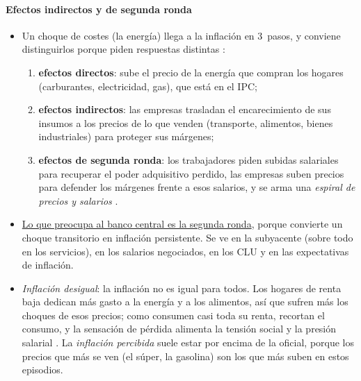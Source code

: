 \documentclass[11pt]{article}
\begin{document}
\paragraph{Efectos indirectos y de segunda ronda}
\begin{itemize}
\item Un choque de costes (la energía) llega a la inflación en 3~pasos, y conviene distinguirlos porque piden respuestas distintas \parencite[cap.~4]{BdE2022InformeAnual2021}:
  \begin{enumerate}
  \item \textbf{efectos directos}: sube el precio de la energía que compran los hogares (carburantes, electricidad, gas), que está en el IPC;
  \item \textbf{efectos indirectos}: las empresas trasladan el encarecimiento de sus insumos a los precios de lo que venden (transporte, alimentos, bienes industriales) para proteger sus márgenes;
  \item \textbf{efectos de segunda ronda}: los trabajadores piden subidas salariales para recuperar el poder adquisitivo perdido, las empresas suben precios para defender los márgenes frente a esos salarios, y se arma una \emph{espiral de precios y salarios} .
  \end{enumerate}
\item \uline{Lo que preocupa al banco central es la segunda ronda}, porque convierte un choque transitorio en inflación persistente. Se ve en la subyacente (sobre todo en los servicios), en los salarios negociados, en los CLU y en las expectativas de inflación.
\item \emph{Inflación desigual}: la inflación no es igual para todos. Los hogares de renta baja dedican más gasto a la energía y a los alimentos, así que sufren más los choques de esos precios; como consumen casi toda su renta, recortan el consumo, y la sensación de pérdida alimenta la tensión social y la presión salarial \parencite{BCE2022RentaBaja}. La \emph{inflación percibida} suele estar por encima de la oficial, porque los precios que más se ven (el súper, la gasolina) son los que más suben en estos episodios.
\end{itemize}
\end{document}

